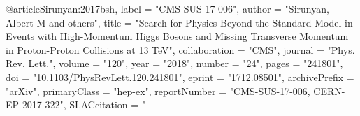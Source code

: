 @article{Sirunyan:2017bsh,
      label          = "CMS-SUS-17-006",
      author         = "Sirunyan, Albert M and others",
      title          = "{Search for Physics Beyond the Standard Model in Events
                        with High-Momentum Higgs Bosons and Missing Transverse
                        Momentum in Proton-Proton Collisions at 13 TeV}",
      collaboration  = "CMS",
      journal        = "Phys. Rev. Lett.",
      volume         = "120",
      year           = "2018",
      number         = "24",
      pages          = "241801",
      doi            = "10.1103/PhysRevLett.120.241801",
      eprint         = "1712.08501",
      archivePrefix  = "arXiv",
      primaryClass   = "hep-ex",
      reportNumber   = "CMS-SUS-17-006, CERN-EP-2017-322",
      SLACcitation   = "%
}

